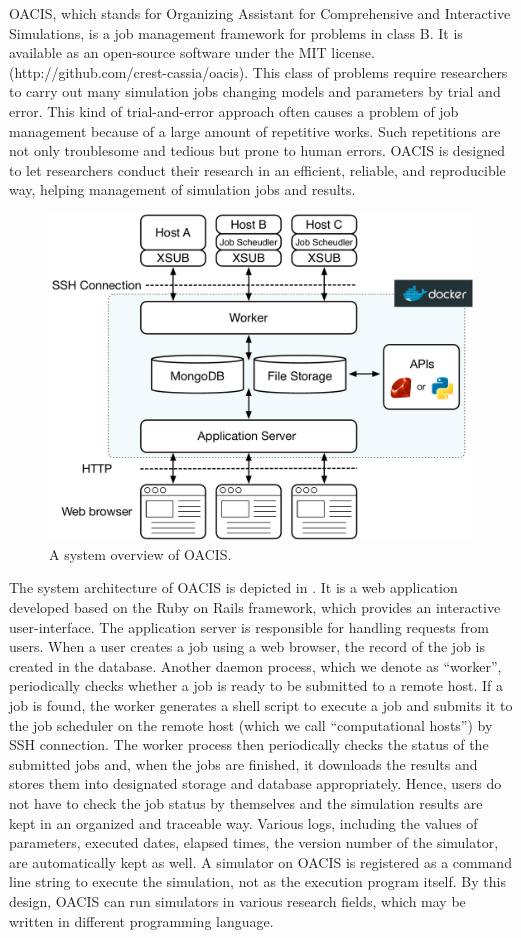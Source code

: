 OACIS, which stands for Organizing Assistant for Comprehensive and Interactive Simulations, is a job management framework for problems in class B\cite{murase2014tool}.
It is available as an open-source software under the MIT license. (http://github.com/crest-cassia/oacis).
This class of problems require researchers to carry out many simulation jobs changing models and parameters by trial and error.
This kind of trial-and-error approach often causes a problem of job management because of a large amount of repetitive works.
Such repetitions are not only troublesome and tedious but prone to human errors.
OACIS is designed to let researchers conduct their research in an efficient, reliable, and reproducible way, helping management of simulation jobs and results.

\begin{figure}
  \centering
  \includegraphics[width=.8\linewidth]{Figs.murase/oacis_overview.pdf}
  \caption{A system overview of OACIS.}
  \label{fig:oacis_overview}
\end{figure}

The system architecture of OACIS is depicted in .
It is a web application developed based on the Ruby on Rails framework, which provides an interactive user-interface.
The application server is responsible for handling requests from users. When a user creates a job using a web browser, the record of the job is created in the database.
Another daemon process, which we denote as ``worker'', periodically checks whether a job is ready to be submitted to a remote host.
If a job is found, the worker generates a shell script to execute a job and submits it to the job scheduler on the remote host (which we call ``computational hosts'') by SSH connection.
The worker process then periodically checks the status of the submitted jobs and, when the jobs are finished, it downloads the results and stores them into designated storage and database appropriately.
Hence, users do not have to check the job status by themselves and the simulation results are kept in an organized and traceable way.
Various logs, including the values of parameters, executed dates, elapsed times, the version number of the simulator, are automatically kept as well.
A simulator on OACIS is registered as a command line string to execute the simulation, not as the execution program itself.
By this design, OACIS can run simulators in various research fields, which may be written in different programming language.

